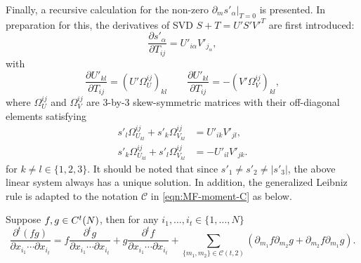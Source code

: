 Finally, a recursive calculation for the non-zero $\left.\partial_m s'_\alpha\right|_{T=0}$ is presented.
In preparation for this, the derivatives of SVD \cite{papadopoulo2000estimating} $S+T = U'S'V'^T$ are first introduced:
\begin{equation} \label{eqn:dsvd-dsdT}
	\frac{\partial s'_\alpha}{\partial T_{ij}} = U'_{i\alpha}V'_{j_\alpha},
\end{equation}
with
\begin{equation} \label{eqn:dsvd-dUVdT}
	\frac{\partial U'_{kl}}{\partial T_{ij}} = \left( U'\Omega_U^{ij} \right)_{kl} \qquad
	\frac{\partial U'_{kl}}{\partial T_{ij}} = -\left( V'\Omega_V^{ij} \right)_{kl},
\end{equation}
where $\Omega_U^{ij}$ and $\Omega_V^{ij}$ are 3-by-3 skew-symmetric matrices with their off-diagonal elements satisfying
\begin{align} \label{eqn:dsvd-OmegaUV}
	s'_l\Omega_{U_{kl}}^{ij} + s'_k\Omega_{V_{kl}}^{ij} &= U'_{ik}V'_{jl}, \nonumber \\
	s'_k\Omega_{U_{kl}}^{ij} + s'_l\Omega_{V_{kl}}^{ij} &= -U'_{il}V'_{jk}.
\end{align}
for $k\neq l \in\{1,2,3\}$.
It should be noted that since $s'_1 \neq s'_2 \neq |s'_3|$, the above linear system always has a unique solution.
In addition, the generalized Leibniz rule is adapted to the notation $\mathcal{C}$ in \eqref{eqn:MF-moment-C} as below.
\begin{lemma} \label{lemma:Leibniz}
	Suppose $f,g\in C^t(\real{N})$, then for any $i_1,\ldots,i_t\in\{1,\ldots,N\}$
	\begin{equation}
		\frac{\partial^t (fg)}{\partial x_{i_1} \cdots \partial x_{i_t}} = f\frac{\partial^t g}{\partial x_{i_1} \cdots \partial x_{i_t}} + g\frac{\partial^t f}{\partial x_{i_1} \cdots \partial x_{i_t}} + \sum_{\{m_1,m_2\}\in\mathcal{C}(t,2)} \left( \partial_{m_1}f\partial_{m_2}g + \partial_{m_2}f\partial_{m_1}g \right).
	\end{equation}
\end{lemma}

